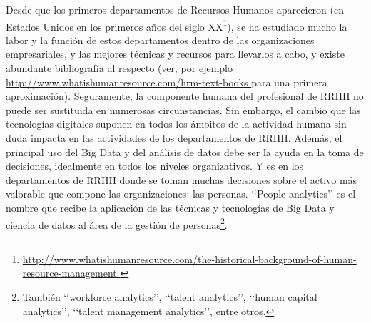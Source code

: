 Desde que los primeros departamentos de Recursos Humanos aparecieron (en Estados Unidos
en los primeros años del siglo XX\footnote{\url{http://www.whatishumanresource.com/the-historical-background-of-human-resource-management }}),
se ha estudiado mucho la labor y la función de estos departamentos dentro de las organizaciones
empresariales, y las mejores técnicas y recursos para llevarlos a cabo, y existe abundante bibliografía
al respecto (ver, por ejemplo \url{http://www.whatishumanresource.com/hrm-text-books } para una
primera aproximación). Seguramente, la componente humana del profesional de RRHH no puede ser sustituida
en numerosas circunstancias. Sin embargo, el cambio que las tecnologías digitales
suponen en todos los ámbitos de la actividad humana sin duda impacta en las
actividades de los departamentos de RRHH. Además, el principal uso del Big Data y del análisis
de datos debe ser la ayuda en la toma de decisiones, idealmente en todos los niveles
organizativos. Y es en los departamentos de RRHH donde se toman muchas decisiones sobre el
activo más valorable que compone las organizaciones: las personas. \lq\lq People analytics\rq\rq
es el nombre que recibe la aplicación de las técnicas y tecnologías de Big Data y ciencia de
datos al área de la gestión de personas\footnote{También  \lq\lq workforce analytics\rq\rq, 
\lq\lq talent analytics\rq\rq, \lq\lq human capital analytics\rq\rq, 
\lq\lq talent management analytics\rq\rq, entre otros.}. 

